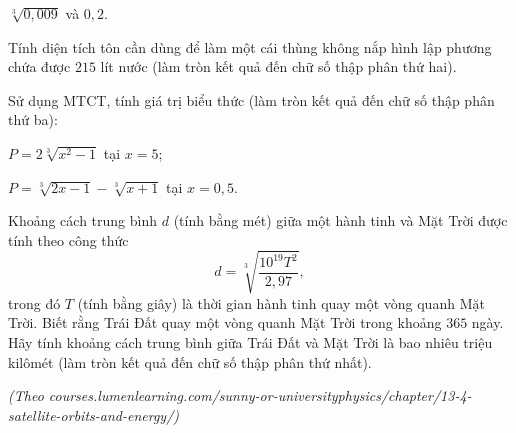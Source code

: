 \begin{practice}
\begin{questions}[resume=SBT]
\begin{questions}
            \answerline
            \answerline

            \item $\sqrt[3]{0,009}$ và $0,2$.

            \answerline
            \answerline
        \end{questions}

        \item Tính diện tích tôn cần dùng để làm một cái thùng không nắp hình lập phương chứa được $215$ lít nước (làm tròn kết quả đến chữ số thập phân thứ hai).

        \answerline
        \answerline
        \answerline

        \item Sử dụng MTCT, tính giá trị biểu thức (làm tròn kết quả đến chữ số thập phân thứ ba):
        \begin{questions}
            \item $P=2\sqrt[3]{x^2-1}$ tại $x=5$;

            \answerline
            \answerline

            \item $P=\sqrt[3]{2x-1}-\sqrt[3]{x+1}$ tại $x=0,5$.

            \answerline
            \answerline
        \end{questions}

        \item Khoảng cách trung bình $d$ (tính bằng mét) giữa một hành tinh và Mặt Trời được tính theo công thức
        \[
            d=\sqrt[3]{\dfrac{10^{19}T^2}{2,97}},
        \]
        trong đó $T$ (tính bằng giây) là thời gian hành tinh quay một vòng quanh Mặt Trời. Biết rằng Trái Đất quay một vòng quanh Mặt Trời trong khoảng $365$ ngày. Hãy tính khoảng cách trung bình giữa Trái Đất và Mặt Trời là bao nhiêu triệu kilômét (làm tròn kết quả đến chữ số thập phân thứ nhất).

        \textit{(Theo courses.lumenlearning.com/sunny-or-universityphysics/chapter/13-4-satellite-orbits-and-energy/)}

        \answerline
        \answerline
        \answerline
    \end{questions}
\end{practice}
